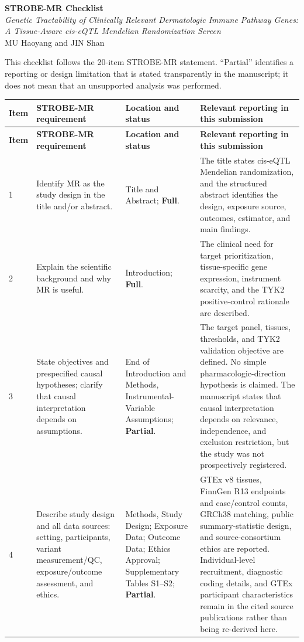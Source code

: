 \documentclass[10pt,a4paper,landscape]{article}
\begin{document}
\begin{center}
{\Large\textbf{STROBE-MR Checklist}}\\[6pt]
\textit{Genetic Tractability of Clinically Relevant Dermatologic Immune Pathway Genes: A Tissue-Aware cis-eQTL Mendelian Randomization Screen}\\[4pt]
MU Haoyang and JIN Shan
\end{center}

\noindent\small This checklist follows the 20-item STROBE-MR statement. ``Partial'' identifies a reporting or design limitation that is stated transparently in the manuscript; it does not mean that an unsupported analysis was performed.

\footnotesize
\begin{longtable}{L{0.8cm}L{5.4cm}L{7.0cm}L{11.0cm}}
\toprule
\textbf{Item} & \textbf{STROBE-MR requirement} & \textbf{Location and status} & \textbf{Relevant reporting in this submission} \\
\midrule
\endfirsthead
\toprule
\textbf{Item} & \textbf{STROBE-MR requirement} & \textbf{Location and status} & \textbf{Relevant reporting in this submission} \\
\midrule
\endhead
\bottomrule
\endfoot

1 & Identify MR as the study design in the title and/or abstract. & Title and Abstract; \textbf{Full}. & The title states cis-eQTL Mendelian randomization, and the structured abstract identifies the design, exposure source, outcomes, estimator, and main findings. \\

2 & Explain the scientific background and why MR is useful. & Introduction; \textbf{Full}. & The clinical need for target prioritization, tissue-specific gene expression, instrument scarcity, and the TYK2 positive-control rationale are described. \\

3 & State objectives and prespecified causal hypotheses; clarify that causal interpretation depends on assumptions. & End of Introduction and Methods, Instrumental-Variable Assumptions; \textbf{Partial}. & The target panel, tissues, thresholds, and TYK2 validation objective are defined. No simple pharmacologic-direction hypothesis is claimed. The manuscript states that causal interpretation depends on relevance, independence, and exclusion restriction, but the study was not prospectively registered. \\

4 & Describe study design and all data sources: setting, participants, variant measurement/QC, exposure/outcome assessment, and ethics. & Methods, Study Design; Exposure Data; Outcome Data; Ethics Approval; Supplementary Tables S1--S2; \textbf{Partial}. & GTEx v8 tissues, FinnGen R13 endpoints and case/control counts, GRCh38 matching, public summary-statistic design, and source-consortium ethics are reported. Individual-level recruitment, diagnostic coding details, and GTEx participant characteristics remain in the cited source publications rather than being re-derived here. \\


\end{longtable}
\end{document}
